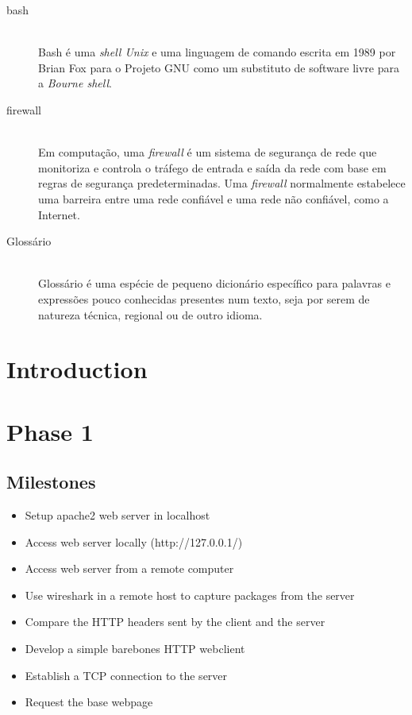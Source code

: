 \documentclass[11pt,a4paper]{report}
\begin{document}
\begin{description}
\item[bash] \hfill \\
  Bash é uma \emph{shell Unix} e uma linguagem de comando escrita
  em 1989 por Brian Fox para o Projeto GNU como um substituto de
  software livre para a \emph{Bourne shell}.
\item[firewall] \hfill \\
  Em computação, uma \emph{firewall} é um sistema de segurança de rede
  que monitoriza e controla o tráfego de entrada e saída da rede
  com base em regras de segurança predeterminadas.
  Uma \emph{firewall} normalmente estabelece uma barreira entre uma
  rede confiável e uma rede não confiável, como a Internet.
\item[Glossário] \hfill \\
  Glossário é uma espécie de pequeno dicionário específico para
  palavras e expressões pouco conhecidas presentes num texto, seja
  por serem de natureza técnica, regional ou de outro idioma.
\end{description}

\chapter{Introduction}
\pagestyle{fancy}
\setcounter{page}{1}



\chapter{Phase 1}
    \section{Milestones}
        \begin{itemize}
            \item Setup apache2 web server in localhost
            \item Access web server locally (http://127.0.0.1/)
            \item Access web server from a remote computer
            \item Use wireshark in a remote host to capture packages from the server
            \item Compare the HTTP headers sent by the client and the server
            \item Develop a simple barebones HTTP webclient
            \item Establish a TCP connection to the server
            \item Request the base webpage
        \end{itemize}
        
\end{document}

